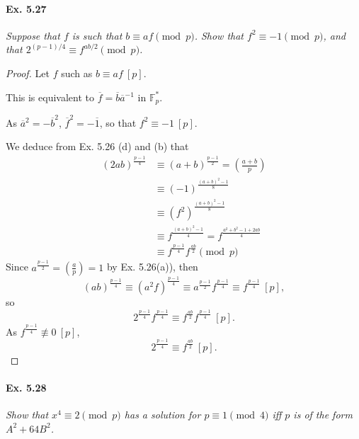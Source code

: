\documentclass[11pt,a4paper]{article}
\newcommand{\legendre}[2]{\genfrac{(}{)}{}{}{#1}{#2}}
\begin{document}
\paragraph{Ex. 5.27}

{\it Suppose that $f$ is such that $b \equiv af \pmod p$. Show that $f^2 \equiv -1 \pmod p$, and that $2^{(p-1)/4} \equiv f^{ab/2} \pmod p$.
}

\begin{proof}
 Let $f$ such as $b \equiv af \ [p]$.
 
This is equivalent to $\overline{f} = \overline{b} \overline{a}^{-1}$ in $\mathbb{F}_p^*$.
 
As $\overline{a}^2 = - \overline{b}^2$, $\overline{f}^2 = -\overline{1}$, so that $f^2 \equiv -1 \ [p]$.
 
We deduce from Ex. 5.26 (d) and (b) that
 \begin{align*}
 (2ab)^{\frac{p-1}{4}} &\equiv (a+b)^{\frac{p-1}{2}} = \legendre{a+b}{p}\\
 &\equiv (-1) ^{\frac{(a+b)^2 - 1}{8}}\ \\
 &\equiv (f^2)^{\frac{(a+b)^2 - 1}{8}}\\
 &\equiv f ^{\frac{(a+b)^2 - 1}{4}} = f^{\frac{a^2+b^2-1 +  2ab}{4}}\\
 &\equiv f^{\frac{p-1}{4}} f^{\frac{ab}{2}} \pmod p
 \end{align*}
Since $a^{\frac{p-1}{2}} = \legendre{a}{p} = 1$ by Ex. 5.26(a)),  
then $$(ab)^{\frac{p-1}{4}} \equiv (a^2 f)^{\frac{p-1}{4}} \equiv a^{\frac{p-1}{2}} f^{\frac{p-1}{4}}\equiv  f^{\frac{p-1}{4}} \ [p],$$
so $$2^{\frac{p-1}{4}} f^{\frac{p-1}{4}} \equiv f^{\frac{ab}{2}}f^{\frac{p-1}{4}}\ [p].$$
As $f^{\frac{p-1}{4}} \not \equiv 0 \ [p]$,
$$2^{\frac{p-1}{4}} \equiv f ^{\frac{a b }{2} }\ [p].$$
\end{proof}

\paragraph{Ex. 5.28}

{\it Show that $x^4 \equiv 2 \pmod p$ has a solution for $p \equiv 1 \pmod 4$ iff $p$ is of the form $A^2 + 64B^2$.
}
\end{document}
